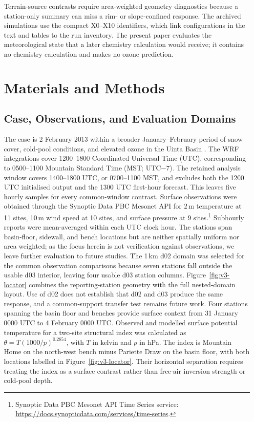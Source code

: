 \documentclass[air,article,submit,moreauthors]{Definitions/mdpi}
\begin{document}
Terrain-source contrasts require area-weighted geometry diagnostics because a station-only summary can miss a rim- or slope-confined response.
The archived simulations use the compact X0--X10 identifiers, which link configurations in the text and tables to the run inventory.
The present paper evaluates the meteorological state that a later chemistry calculation would receive; it contains no chemistry calculation and makes no ozone prediction.

\section{Materials and Methods}
\label{sec:v3-methods}

\subsection{Case, Observations, and Evaluation Domains}
\label{sec:v3-case}

The case is 2 February 2013 within a broader January--February period of snow cover, cold-pool conditions, and elevated ozone in the Uinta Basin \citep{Neemann2015-ws,Ahmadov2015-zm,Tran2018-ax}.
The WRF integrations cover 1200--1800 Coordinated Universal Time (UTC), corresponding to 0500--1100 Mountain Standard Time (MST; UTC$-7$).
The retained analysis window covers 1400--1800 UTC, or 0700--1100 MST, and excludes both the 1200 UTC initialised output and the 1300 UTC first-hour forecast.
This leaves five hourly samples for every common-window contrast.
Surface observations were obtained through the Synoptic Data PBC Mesonet API for 2\,m temperature at 11 sites, 10\,m wind speed at 10 sites, and surface pressure at 9 sites.\footnote{Synoptic Data PBC Mesonet API Time Series service: \url{https://docs.synopticdata.com/services/time-series}.}
Subhourly reports were mean-averaged within each UTC clock hour.
The stations span basin-floor, sidewall, and bench locations but are neither spatially uniform nor area weighted; as the focus herein is not verification against observations, we leave further evaluation to future studies.
The 1\,km d02 domain was selected for the common observation comparisons because seven stations fall outside the usable d03 interior, leaving four usable d03 station columns.
Figure~\ref{fig:v3-locator} combines the reporting-station geometry with the full nested-domain layout.
Use of d02 does not establish that d02 and d03 produce the same response, and a common-support transfer test remains future work.
Four stations spanning the basin floor and benches provide surface context from 31 January 0000 UTC to 4 February 0000 UTC.
Observed and modelled surface potential temperature for a two-site structural index was calculated as $\theta=T(1000/p)^{0.2854}$, with $T$ in kelvin and $p$ in hPa.
The index is Mountain Home on the north-west bench minus Pariette Draw on the basin floor, with both locations labelled in Figure~\ref{fig:v3-locator}.
Their horizontal separation requires treating the index as a surface contrast rather than free-air inversion strength or cold-pool depth.
\end{document}
